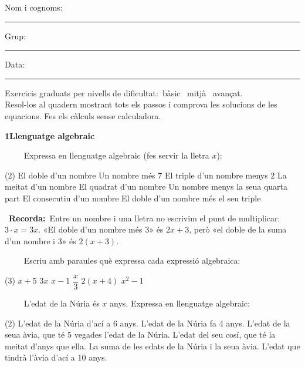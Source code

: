 \documentclass[11pt,a4paper]{article}
\newcommand{\estrelles}[1]{{\color{accent}\ifcase#1\or\faStar\faStar[regular]\faStar[regular]\or\faStar\faStar\faStar[regular]\or\faStar\faStar\faStar\fi}}
\newcounter{exer}
\newcommand{\ex}[1]{\par\needspace{4\baselineskip}\medskip\stepcounter{exer}\noindent{\color{navy}\bfseries\theexer.}\ \ {\small\estrelles{#1}}\ \ }
\newcommand{\seccio}[2]{\par\needspace{10\baselineskip}\bigskip
  \begin{tcolorbox}[colback=navy,colframe=navy,coltext=white,arc=2mm,boxrule=0pt,left=3mm,right=3mm,top=1.2mm,bottom=1.2mm]
  {\large\bfseries #1\quad #2}
  \end{tcolorbox}\vspace{-2pt}}
\newcommand{\recorda}[1]{\par\smallskip\begin{tcolorbox}[colback=accent!7,colframe=accent!55,arc=2mm,boxrule=0.5pt,left=2.5mm,right=2.5mm,top=1mm,bottom=1mm]\small{\color{accent}\faLightbulb[regular]}\ \textbf{Recorda:}\ #1\end{tcolorbox}}
\begin{document}
\thispagestyle{primera}

\vspace{10pt}
Nom i cognoms: \rule{8.4cm}{0.4pt}\hfill Grup: \rule{1.6cm}{0.4pt}\hfill Data: \rule{2.2cm}{0.4pt}
\vspace{8pt}

\begin{tcolorbox}[colback=soft,colframe=soft,arc=2mm,left=3mm,right=3mm,top=1.5mm,bottom=1.5mm]
\small Exercicis graduats per nivells de dificultat:\quad \estrelles{1}\ bàsic \qquad \estrelles{2}\ mitjà \qquad \estrelles{3}\ avançat.\\[2pt] Resol-los al quadern mostrant tots els passos i comprova les solucions de les equacions. Fes els càlculs sense calculadora.
\end{tcolorbox}

\seccio{1}{Llenguatge algebraic}

\ex{1} Expressa en llenguatge algebraic (fes servir la lletra $x$):\begin{tasks}(2)
  \task El doble d'un nombre
  \task Un nombre més 7
  \task El triple d'un nombre menys 2
  \task La meitat d'un nombre
  \task El quadrat d'un nombre
  \task Un nombre menys la seua quarta part
  \task El consecutiu d'un nombre
  \task El doble d'un nombre més el seu triple
\end{tasks}\recorda{Entre un nombre i una lletra no escrivim el punt de multiplicar: $3\cdot x=3x$. «El doble d'un nombre més 3» és $2x+3$, però «el doble de la suma d'un nombre i 3» és $2(x+3)$.}

\ex{1} Escriu amb paraules què expressa cada expressió algebraica:\begin{tasks}(3)
  \task $x+5$
  \task $3x$
  \task $x-1$
  \task $\dfrac{x}{3}$
  \task $2(x+4)$
  \task $x^2-1$
\end{tasks}

\ex{2} L'edat de la Núria és $x$ anys. Expressa en llenguatge algebraic:\begin{tasks}(2)
  \task L'edat de la Núria d'ací a 6 anys.
  \task L'edat de la Núria fa 4 anys.
  \task L'edat de la seua àvia, que té 5 vegades l'edat de la Núria.
  \task L'edat del seu cosí, que té la meitat d'anys que ella.
  \task La suma de les edats de la Núria i la seua àvia.
  \task L'edat que tindrà l'àvia d'ací a 10 anys.
\end{tasks}
\end{document}

